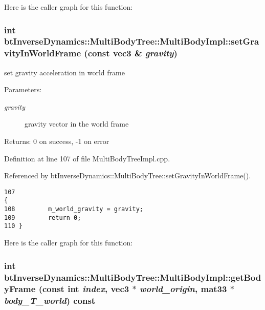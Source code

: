 Here is the caller graph for this function:\hypertarget{classbt_inverse_dynamics_1_1_multi_body_tree_1_1_multi_body_impl_6a9262d27208b099f1753bfb34178686}{
\subsubsection[setGravityInWorldFrame]{\setlength{\rightskip}{0pt plus 5cm}int btInverseDynamics::MultiBodyTree::MultiBodyImpl::setGravityInWorldFrame (const {\bf vec3} \& {\em gravity})}}
\label{classbt_inverse_dynamics_1_1_multi_body_tree_1_1_multi_body_impl_6a9262d27208b099f1753bfb34178686}


set gravity acceleration in world frame \begin{Desc}
\item[Parameters:]
\begin{description}
\item[{\em gravity}]gravity vector in the world frame \end{description}
\end{Desc}
\begin{Desc}
\item[Returns:]0 on success, -1 on error \end{Desc}


Definition at line 107 of file MultiBodyTreeImpl.cpp.

Referenced by btInverseDynamics::MultiBodyTree::setGravityInWorldFrame().

\begin{Code}\begin{verbatim}107                                                                           {
108         m_world_gravity = gravity;
109         return 0;
110 }
\end{verbatim}
\end{Code}




Here is the caller graph for this function:\hypertarget{classbt_inverse_dynamics_1_1_multi_body_tree_1_1_multi_body_impl_7396d5bfe0026ae4e79a01e24f7cd708}{
\subsubsection[getBodyFrame]{\setlength{\rightskip}{0pt plus 5cm}int btInverseDynamics::MultiBodyTree::MultiBodyImpl::getBodyFrame (const int {\em index}, \/  {\bf vec3} $\ast$ {\em world\_\-origin}, \/  mat33 $\ast$ {\em body\_\-T\_\-world}) const}}
\label{classbt_inverse_dynamics_1_1_multi_body_tree_1_1_multi_body_impl_7396d5bfe0026ae4e79a01e24f7cd708}


